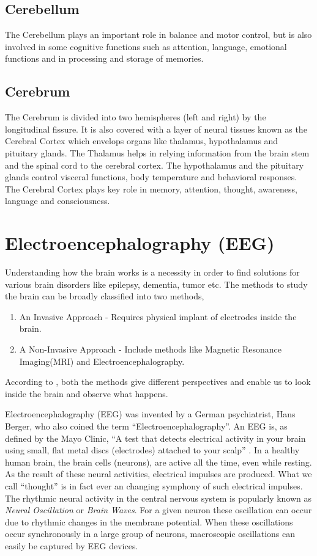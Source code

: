 	\subsection{Cerebellum} 
        	The Cerebellum plays an important role in balance and motor control, but is also involved in some cognitive functions such as attention, language, emotional functions and in processing and storage of memories.

 	\subsection{Cerebrum}
    	The Cerebrum is divided into two hemispheres (left and right) by the longitudinal fissure. It is also covered with a layer of neural tissues known as the Cerebral Cortex which envelops organs like thalamus, hypothalamus and pituitary glands. The Thalamus helps in relying information from the brain stem and the spinal cord to the cerebral cortex. The hypothalamus and the pituitary glands control visceral functions, body temperature and behavioral responses.  The Cerebral Cortex plays key role in memory, attention, thought, awareness, language and consciousness.
        
\section{Electroencephalography (EEG)}
\label{Electroencephalography (EEG)}
	Understanding how the brain works is a necessity in order to find solutions for various brain disorders like epilepsy, dementia, tumor etc. The methods to study the brain can be broadly classified into two methods,
    \begin{enumerate}
		\item An Invasive Approach - Requires physical implant of electrodes inside the brain.
        \item A Non-Invasive Approach - Include methods like Magnetic Resonance Imaging(MRI) and Electroencephalography.
	\end{enumerate}
    According to \cite{Kropotov}, both the methods give different perspectives and enable us to look inside the brain and observe what happens.
    
    
    Electroencephalography (EEG) was invented by a German psychiatrist, Hans Berger, who also coined the term ``Electroencephalography''. An EEG is, as defined by the Mayo Clinic, ``A test that detects electrical activity in your brain using small, flat metal discs (electrodes) attached to your scalp'' . In a healthy human brain, the brain cells (neurons), are active all the time, even while resting. As the result of these neural activities, electrical impulses are produced. What we call ``thought'' is in fact ever an changing symphony of such electrical impulses. The rhythmic neural activity in the central nervous system is popularly known as \textit{Neural Oscillation} or \textit{Brain Waves}.  For a given neuron these oscillation can occur due to rhythmic changes in the membrane potential. When these oscillations occur synchronously in a large group of neurons, macroscopic oscillations can easily be captured by EEG devices.

